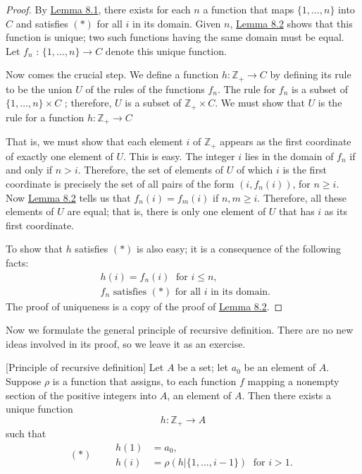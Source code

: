 \begin{proof}
 By \hyperref[lem:8.1]{Lemma 8.1}, there exists for each \(n\) a function that maps \(\{1,\ldots, n\}\) into \(C\) and satisfies \((*)\) for all \(i\) in its domain. Given \(n\), \hyperref[lem:8.2]{Lemma 8.2} shows that this function is unique; two such functions having the same domain must be equal. Let \(f_{n}\) : \(\{1,\ldots, n\} \rightarrow C\) denote this unique function.

 Now comes the crucial step. We define a function \(h : \mathbb{Z}_{+} \rightarrow C\) by defining its rule to be the union \(U\) of the rules of the functions \(f_{n}\). The rule for \(f_{n}\) is a subset of \(\{1,\ldots, n\} \times C\) ; therefore, \(U\) is a subset of \(\mathbb{Z}_{+} \times C\). We must show that \(U\) is the rule for a function \(h : \mathbb{Z}_{+} \rightarrow C\)

 That is, we must show that each element \(i\) of \(\mathbb{Z}_{+}\) appears as the first coordinate of exactly one element of \(U\). This is easy. The integer \(i\) lies in the domain of \(f_{n}\) if and only if \(n > i\). Therefore, the set of elements of \(U\) of which \(i\) is the first coordinate is precisely the set of all pairs of the form \(({i,f_{n}(i) })\), for \(n \geq i\). Now \hyperref[lem:8.2]{Lemma 8.2} tells us that \(f_{n}(i) = f_{m}(i)\) if \(n,m \geq i\). Therefore, all these elements of \(U\) are equal; that is, there is only one element of \(U\) that has \(i\) as its first coordinate.

 To show that \(h\) satisfies \((*)\) is also easy; it is a consequence of the following facts:
 \[
 \begin{aligned}
 &h(i) = f_{n}(i) \;\text{ for }i \leq n, \\
 &f_{n}\text{ satisfies }(*) \text{ for all }i\text{ in its domain. }
 \end{aligned}
 \]
 The proof of uniqueness is a copy of the proof of \hyperref[lem:8.2]{Lemma 8.2}.
\end{proof}

Now we formulate the general principle of recursive definition. 
There are no new ideas involved in its proof, so we leave it as an exercise.

\begin{theorem}
\label{thm:\thetheorem}[Principle of recursive definition] 
 Let \(A\) be a set; let \(a_{0}\) be an element of \(A\). Suppose \(\rho\) is a function that assigns, to each function \(f\) mapping a nonempty section of the positive integers into \(A\), an element of \(A\). Then there exists a unique function
 \[
 h : \mathbb{Z}_{+} \rightarrow A
 \]
 such that
 \[
 (*) \qquad
 \begin{aligned}
 h(1) &= a_{0}, \\
 h(i) &= \rho ({h|\{1,\ldots, i - 1\} }) \;\text{ for }i > 1.
 \end{aligned}
 \]
\end{theorem}

